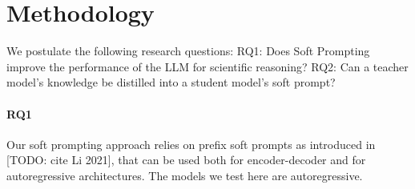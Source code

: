 \documentclass{article}
\begin{document}

\section{Methodology}
We postulate the following research questions: 
RQ1: Does Soft Prompting improve the performance of the LLM for scientific reasoning?
RQ2: Can a teacher model's knowledge be distilled into a student model's soft prompt?


\paragraph{RQ1}
Our soft prompting approach relies on prefix soft prompts as introduced in [TODO: cite Li 2021], that can be used both for encoder-decoder and for autoregressive architectures. The models we test here are autoregressive.
\end{document}
